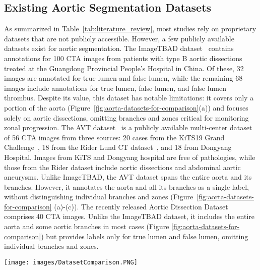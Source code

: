 \subsection{Existing Aortic Segmentation Datasets}
\label{sect:about-the-dataset}
As summarized in Table~\ref{tab:literature_review}, most studies rely on proprietary datasets that are not publicly accessible. However, a few publicly available datasets exist for aortic segmentation. The ImageTBAD dataset~\citep{yao2021imagetbad} contains annotations for 100 CTA images from patients with type B aortic dissections treated at the Guangdong Provincial People’s Hospital in China. Of these, 32 images are annotated for true lumen and false lumen, while the remaining 68 images include annotations for true lumen, false lumen, and false lumen thrombus.  Despite its value, this dataset has notable limitations: it covers only a portion of the aorta (Figure~\ref{fig:aorta-datasets-for-comparison}(a)) and focuses solely on aortic dissections, omitting branches and zones critical for monitoring zonal progression. The AVT dataset~\citep{radl2022avt} is a publicly available multi-center dataset of 56 CTA images from three sources: 20 cases from the KiTS19 Grand Challenge~\cite{heller2019kits19, heller2021state}, 18 from the Rider Lund CT dataset~\citep{zhao2015data}, and 18 from Dongyang Hospital. Images from KiTS and Dongyang hospital are free of pathologies, while those from the Rider dataset include aortic dissections and abdominal aortic aneurysms. Unlike ImageTBAD, the AVT dataset spans the entire aorta and its branches. However, it annotates the aorta and all its branches as a single label, without distinguishing individual branches and zones (Figure~\ref{fig:aorta-datasets-for-comparison} (a)-(c)). The recently released Aortic Dissection Dataset~\citep{mayer2024type} comprises 40 CTA images. Unlike the ImageTBAD dataset, it includes the entire aorta and some aortic branches in most cases (Figure \ref{fig:aorta-datasets-for-comparison}) but provides labels only for true lumen and false lumen, omitting individual branches and zones.

\begin{figure*}[!hbt]%
\centering
\texttt{[image: images/DatasetComparison.PNG]}
\caption{Comparison of various publicly available aortic segmentation datasets}
\label{fig:aorta-datasets-for-comparison}%
\end{figure*}

